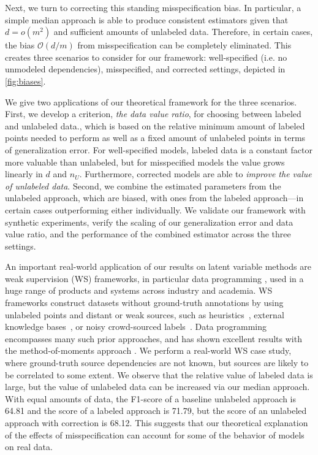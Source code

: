 Next, we turn to correcting this standing misspecification bias. In particular, a simple median approach is able to produce consistent estimators given that $d = o(m^2)$ and sufficient amounts of unlabeled data. Therefore, in certain cases, the bias $\mathcal{O}(d/m)$ from misspecification can be completely eliminated. This creates three scenarios to consider for our framework: well-specified (i.e. no unmodeled dependencies), misspecified, and corrected settings, depicted in \autoref{fig:biases}.

We give two applications of our theoretical framework for the three scenarios. First, we develop a criterion, \textit{the data value ratio}, for choosing between labeled and unlabeled data., which is based on the relative minimum amount of labeled points needed to perform as well as a fixed amount of unlabeled points in terms of generalization error. For well-specified models, labeled data is a constant factor more valuable than unlabeled, but for misspecified models the value grows linearly in $d$ and $n_U$. Furthermore, corrected models are able to \emph{improve the value of unlabeled data}. Second, we combine the estimated parameters from the unlabeled approach, which are biased, with ones from the labeled approach---in certain cases outperforming either individually. We validate our framework with synthetic experiments, verify the scaling of our generalization error and data value ratio, and the performance of the combined estimator across the three settings. 

An important real-world application of our results on latent variable methods are weak supervision (WS) frameworks, in particular data programming \citep{Ratner16}, used in a huge range of products and systems across industry and academia. WS frameworks construct datasets without ground-truth annotations by using unlabeled points and distant or weak sources, such as heuristics~\citep{gupta2014improved}, external knowledge bases~\citep{mintz2009distant,craven:ismb99,takamatsu:acl12}, or noisy crowd-sourced labels~\citep{karger2011iterative,dawid1979maximum}. Data programming encompasses many such prior approaches, and has shown excellent results with the method-of-moments approach \citep{fu2020fast}. We perform a real-world WS case study, where ground-truth source dependencies are not known, but sources are likely to be correlated to some extent. We observe that the relative value of labeled data is large, but the value of unlabeled data can be increased via our median approach. With equal amounts of data, the F1-score of a baseline unlabeled approach is 64.81 and the score of a labeled approach is 71.79, but the score of an unlabeled approach with correction is 68.12. This suggests that our theoretical explanation of the effects of misspecification can account for some of the behavior of models on real data.

